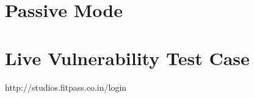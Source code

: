\section{Passive Mode}


\section{Live Vulnerability Test Case}

http://studios.fitpass.co.in/login





















